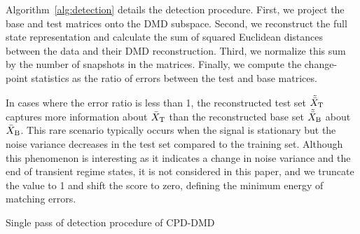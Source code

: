 Algorithm~\ref{alg:detection} details the detection procedure. First, we project the base and test matrices onto the DMD subspace. Second, we reconstruct the full state representation and calculate the sum of squared Euclidean distances between the data and their DMD reconstruction. Third, we normalize this sum by the number of snapshots in the matrices. Finally, we compute the change-point statistics as the ratio of errors between the test and base matrices.  %

In cases where the error ratio is less than 1, the reconstructed test set \(\tilde{\bar{X}} _{\text{T}}\) captures more information about \(\bar{X} _{\text{T}}\) than the reconstructed base set \(\tilde{\bar{X}} _{\text{B}}\) about \(\bar{X} _{\text{B}}\). This rare scenario typically occurs when the signal is stationary but the noise variance decreases in the test set compared to the training set. Although this phenomenon is interesting as it indicates a change in noise variance and the end of transient regime states, it is not considered in this paper, and we truncate the value to 1 and shift the score to zero, defining the minimum energy of matching errors.

\begin{algorithm}
    \caption{Single pass of detection procedure of CPD-DMD}\label{alg:detection}
    \begin{algorithmic}[1]
    \end{algorithmic}
\end{algorithm}


